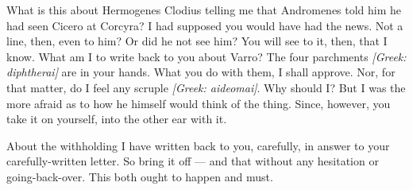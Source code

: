 

 What is this about Hermogenes Clodius telling me that Andromenes told him he had seen Cicero at Corcyra? I had supposed you would have had the news. Not a line, then, even to him? Or did he not see him? You will see to it, then, that I know. What am I to write back to you about Varro? The four parchments \textit{[Greek: diphtherai]} are in your hands. What you do with them, I shall approve. Nor, for that matter, do I feel any scruple \textit{[Greek: aideomai]}. Why should I? But I was the more afraid as to how he himself would think of the thing. Since, however, you take it on yourself, into the other ear with it.

 About the withholding I have written back to you, carefully, in answer to your carefully-written letter. So bring it off --- and that without any hesitation or going-back-over. This both ought to happen and must.
